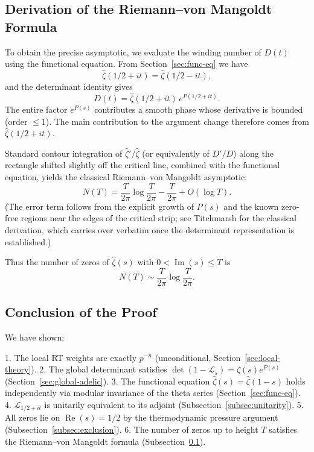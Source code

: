 \documentclass[11pt,a4paper]{amsart}
\begin{document}
\subsection{Derivation of the Riemann--von Mangoldt Formula}
\label{subsec:von-mangoldt}

To obtain the precise asymptotic, we evaluate the winding number of \(D(t)\) using the functional equation. From Section~\ref{sec:func-eq} we have
\[
\hat{\zeta}(1/2 + it) = \hat{\zeta}(1/2 - it),
\]
and the determinant identity gives
\[
D(t) = \hat{\zeta}(1/2 + it) \, e^{P(1/2 + it)}.
\]
The entire factor \(e^{P(s)}\) contributes a smooth phase whose derivative is bounded (order \(\leq 1\)). The main contribution to the argument change therefore comes from \(\hat{\zeta}(1/2 + it)\).

Standard contour integration of \(\hat{\zeta}'/\hat{\zeta}\) (or equivalently of \(D'/D\)) along the rectangle shifted slightly off the critical line, combined with the functional equation, yields the classical Riemann--von Mangoldt asymptotic:
\[
N(T) = \frac{T}{2\pi}\log\frac{T}{2\pi} - \frac{T}{2\pi} + O(\log T).
\]
(The error term follows from the explicit growth of \(P(s)\) and the known zero-free regions near the edges of the critical strip; see Titchmarsh \cite{Titchmarsh1986} for the classical derivation, which carries over verbatim once the determinant representation is established.)

Thus the number of zeros of \(\hat{\zeta}(s)\) with \(0 < \operatorname{Im}(s) \leq T\) is
\[
N(T) \sim \frac{T}{2\pi}\log\frac{T}{2\pi}.
\]

\subsection{Conclusion of the Proof}
\label{subsec:conclusion-proof}

We have shown:

1. The local RT weights are exactly \(p^{-n}\) (unconditional, Section~\ref{sec:local-theory}).
2. The global determinant satisfies \(\det(1 - \mathcal{L}_s) = \hat{\zeta}(s) e^{P(s)}\) (Section~\ref{sec:global-adelic}).
3. The functional equation \(\hat{\zeta}(s) = \hat{\zeta}(1-s)\) holds independently via modular invariance of the theta series (Section~\ref{sec:func-eq}).
4. \(\mathcal{L}_{1/2+it}\) is unitarily equivalent to its adjoint (Subsection~\ref{subsec:unitarity}).
5. All zeros lie on \(\operatorname{Re}(s)=1/2\) by the thermodynamic pressure argument (Subsection~\ref{subsec:exclusion}).
6. The number of zeros up to height \(T\) satisfies the Riemann--von Mangoldt formula (Subsection~\ref{subsec:von-mangoldt}).
\end{document}
